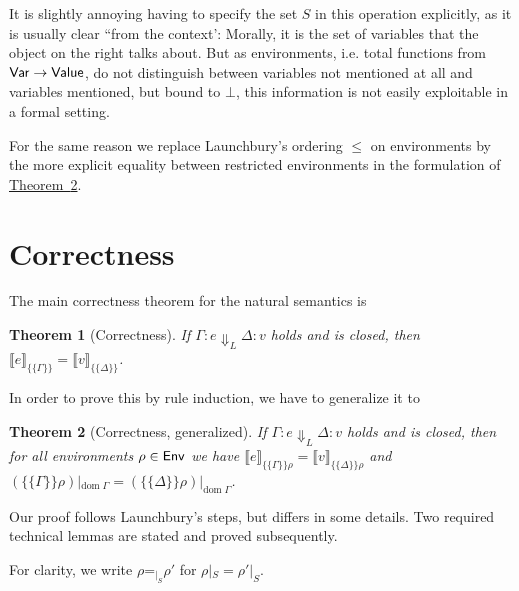 \documentclass{jfp1}
\newcommand{\myref}[2]{\hyperref[#2]{#1~\ref*{#2}}}
\newtheorem{theorem}{Theorem}
\theoremstyle{nonumberbreak}
\newcommand{\sVar}   {\text{\textsf{Var}}}
\newcommand{\sValue} {\text{\textsf{Value}}}
\newcommand{\sEnv}   {\text{\textsf{Env}}}
\newcommand{\sred}[5]{#1 : #2 \Downarrow_{#3} #4 : #5}
\newcommand{\sRule}[1]{\text{{\textsc{#1}}}}
\newcommand{\dom}[1]{\text{dom}\;#1}
\newcommand{\dsem}[2]{\llbracket #1 \rrbracket_{#2}}
\newcommand{\esem}[1]{\{\!\!\!\{#1\}\!\!\!\}}
\newcommand{\eqon}[1]{\mathrel{\mathord=_{\mathord|_{#1}}}}
\begin{document}
It is slightly annoying having to specify the set $S$ in this operation explicitly, as it is usually clear ``from the context': Morally, it is the set of variables that the object on the right talks about. But as environments, i.e. total functions from $\sVar \to \sValue$, do not distinguish between variables not mentioned at all and variables mentioned, but bound to $\bot$, this information is not easily exploitable in a formal setting.

For the same reason we replace Launchbury’s ordering $\le$ on environments by the more explicit equality between restricted environments in the formulation of \myref{Theorem}{thm_thm2}.

\section{Correctness}
\label{sec_correctness}

The main correctness theorem for the natural semantics is
\begin{theorem}[Correctness]
If $\sred \Gamma e L \Delta v$ holds and is closed, then $\dsem{e}{\esem{\Gamma}} = \dsem{v}{\esem{\Delta}}$.
\label{thm_main}
\end{theorem}

In order to prove this by rule induction, we have to generalize it to

\begin{theorem}[Correctness, generalized]
If $\sred \Gamma e L \Delta v$ holds and is closed, then for all environments $\rho \in \sEnv$ we have $\dsem{e}{\esem{\Gamma}{\rho}} = \dsem{v}{\esem{\Delta}{\rho}}$ and $(\esem\Gamma\rho)|_{\dom\Gamma} = (\esem\Delta\rho)|_{\dom\Gamma}$.%
\label{thm_thm2}
\end{theorem}

Our proof follows Launchbury's steps, but differs in some details.
Two required technical lemmas are stated and proved subsequently.

For clarity, we write $\rho \eqon{S} \rho'$ for $\rho|_S = \rho'|_S$.
\end{document}
